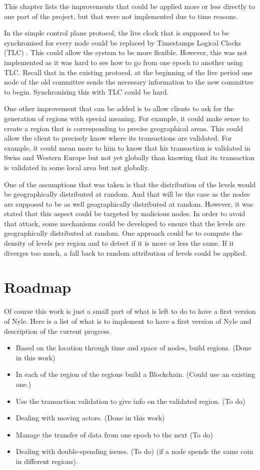 \documentclass[a4paper,11pt,oneside]{report}
\begin{document}
This chapter lists the improvements that could be applied more or less directly
to one part of the project, but that were not implemented due to time reasons. 

In the simple control plane protocol, the live clock that is supposed to be
synchronised for every node could be replaced by Timestamps Logical Clocks (TLC)
\cite{Ford2019}. This could allow the system to be more flexible.
However, this was not implemented as it was hard to see how to go from one
epoch to another using TLC. Recall that in the existing protocol, at the
beginning of the live period one node of the old committee sends the necessary
information to the new committee to begin. Synchronising this with TLC could be hard.

One other improvement that can be added is to allow clients to ask for the
generation of regions with special meaning. For example, it could make sense to
create a region that is corresponding to precise geographical areas. This could
allow the client to precisely know where its transactions are validated. For
example, it could mean more to him to know that his transaction is validated in
Swiss and Western Europe but not yet globally than knowing that its transaction
is validated in some local area but not globally. 

One of the assumptions that was taken is that the distribution of the levels
would be geographically distributed at random. And that will be the case as the
nodes are  supposed to be as well geographically distributed at random.
However, it was stated that this aspect could be targeted by malicious nodes.
In order to avoid that attack, some mechanisms could be developed to ensure
that the levels are geographically distributed at random. One approach could be
to compute the density of levels per region and to detect if it is more or less
the same. If it diverges too much, a fall back to random attribution of levels
could be applied. 

\section{Roadmap}
Of course this work is just a small part of what is left to do to have a first
version of Nyle. Here is a list of what is to implement to have a first version
of Nyle and description of the current progress.

\begin{itemize} 
\item Based on the location through time and space of nodes, build regions.
(Done in this work)
\item In each of the region of the regions build a Blockchain. (Could use an
    existing one.)
\item Use the transaction validation to give info on the validated region. (To
do) 
\item Dealing with moving actors. (Done in this work)
\item Manage the transfer of data from one epoch to the next (To do)
\item Dealing with double-spending issues. (To do)
(if a node spends the same coin in different regions). 
\end{itemize}
\end{document}
